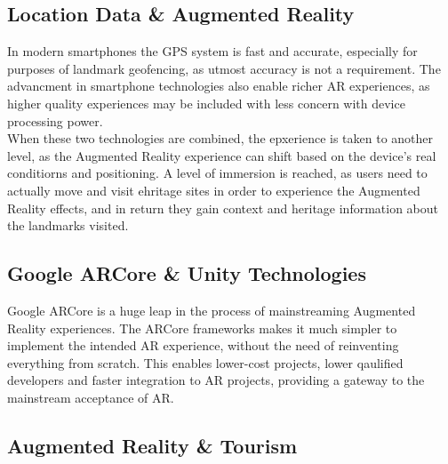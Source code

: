 \subsection{Location Data \&  Augmented Reality}
In modern smartphones the GPS system is fast and accurate, especially for purposes of landmark geofencing, 
as utmost accuracy is not a requirement. The advancment in smartphone technologies also enable richer AR experiences, as higher quality 
experiences may be included with less concern with device processing power.\\
When these two technologies are combined, the epxerience is taken to another level, as the Augmented Reality experience can shift based on 
the device's real conditiorns and positioning. A level of immersion is reached, as users need to actually move and visit ehritage sites in 
order to experience the Augmented Reality effects, and in return they gain context and heritage information about the landmarks visited.   
\subsection{Google ARCore \& Unity Technologies}
Google ARCore is a huge leap in the process of mainstreaming Augmented Reality experiences. The ARCore frameworks makes it much simpler 
to implement the intended AR experience, without the need of reinventing everything from scratch. This enables lower-cost projects, lower 
qaulified developers and faster integration to AR projects, providing a gateway to the mainstream acceptance of AR. 
\subsection{Augmented Reality \& Tourism}